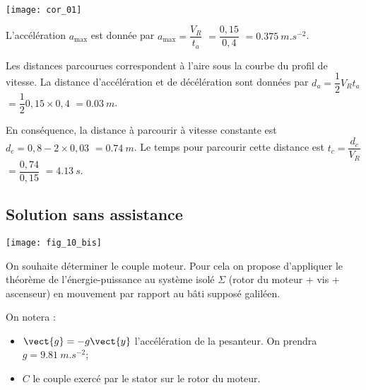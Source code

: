 \ifprof
\begin{corrige}~\\

\begin{center}
\texttt{[image: cor\_01]}
\end{center}

L’accélération $a_{\text{max}}$ est donnée par $a_{\text{max}} = \dfrac{V_R}{t_a}$ $=\dfrac{0,15}{0,4}$ $=\SI{0,375}{m.s^{-2}}$. 

Les distances parcourues correspondent à l'aire sous la courbe du profil de vitesse. La distance d'accélération et de décélération sont données par $d_a=\dfrac{1}{2}V_R t_a$ $=\dfrac{1}{2}0,15\times 0,4$ $=\SI{0,03}{m}$.

En conséquence, la distance à parcourir à vitesse constante est $d_c=0,8-2\times 0,03$ $=\SI{0,74}{m}$. Le temps pour parcourir cette distance est $t_c=\dfrac{d_c}{V_R}$ $=\dfrac{0,74}{0,15}$ $=\SI{4,13}{s}$.
\end{corrige}
\else
\fi

\subsection*{Solution sans assistance}
\ifprof
\else

\begin{marginfigure}
\texttt{[image: fig\_10\_bis]}
\end{marginfigure}

On souhaite déterminer le couple moteur. Pour cela on propose d’appliquer le théorème de
l’énergie-puissance au système isolé $\Sigma$ (rotor du moteur + vis + ascenseur) en mouvement
par rapport au bâti supposé galiléen. 

On notera :
\begin{itemize}
\item $\vect{g}=-g\vect{y}$ l’accélération de la pesanteur. On prendra $g=\SI{9,81}{m.s^{-2}}$;
\item $C$ le couple exercé par le stator sur le rotor du moteur.
\end{itemize}
\fi

